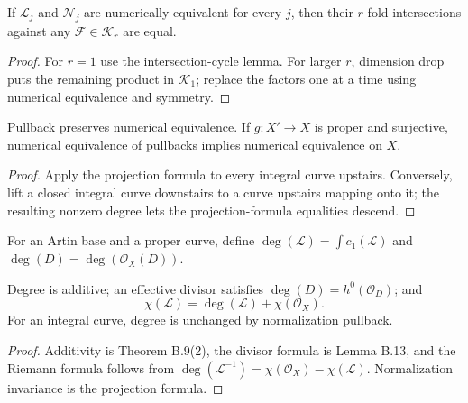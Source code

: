 \begin{proposition}\label{kps-prop-numerical-invariance}
If $\mathcal L_j$ and $\mathcal N_j$ are numerically equivalent for every $j$,
then their $r$-fold intersections against any $\mathcal F\in\mathcal K_r$
are equal.
\end{proposition}
\begin{proof}
For $r=1$ use the intersection-cycle lemma. For larger $r$, dimension drop
puts the remaining product in $\mathcal K_1$; replace the factors one at a
time using numerical equivalence and symmetry.
\end{proof}

\begin{proposition}\label{kps-prop-numerical-pullback}
Pullback preserves numerical equivalence. If $g:X'\to X$ is proper and
surjective, numerical equivalence of pullbacks implies numerical equivalence
on $X$.
\end{proposition}
\begin{proof}
Apply the projection formula to every integral curve upstairs. Conversely,
lift a closed integral curve downstairs to a curve upstairs mapping onto it;
the resulting nonzero degree lets the projection-formula equalities descend.
\end{proof}

\begin{definition}\label{kps-def-degree}
For an Artin base and a proper curve, define
$\deg(\mathcal L)=\int c_1(\mathcal L)$ and
$\deg(D)=\deg(\mathcal O_X(D))$.
\end{definition}

\begin{proposition}\label{kps-prop-riemann}
Degree is additive; an effective divisor satisfies
$\deg(D)=h^0(\mathcal O_D)$; and
\[
 \chi(\mathcal L)=\deg(\mathcal L)+\chi(\mathcal O_X).
\]
For an integral curve, degree is unchanged by normalization pullback.
\end{proposition}
\begin{proof}
Additivity is Theorem B.9(2), the divisor formula is Lemma B.13, and the
Riemann formula follows from
$\deg(\mathcal L^{-1})=\chi(\mathcal O_X)-\chi(\mathcal L)$. Normalization
invariance is the projection formula.
\end{proof}

